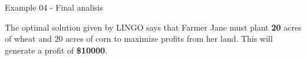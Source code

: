 \begin{frame}{Example 04 - Final analisis}

The optimal solution given by LINGO says that Farmer Jane must plant \textbf{20}
acres of wheat and 20 acres of corn to maximize profits from her land. This will
generate a profit of \textbf{\$10000}.

\end{frame}
